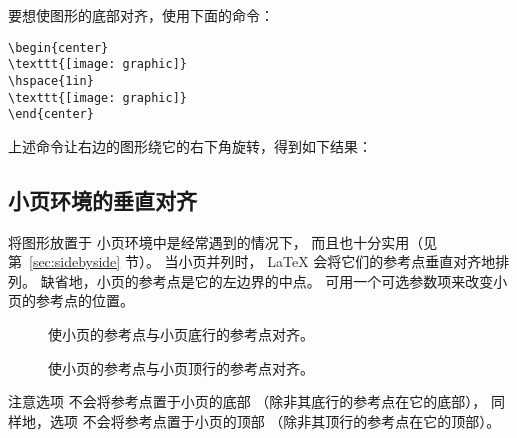 要想使图形的底部对齐，使用下面的命令：
\begin{lstlisting}
\begin{center}
\texttt{[image: graphic]}
\hspace{1in}
\texttt{[image: graphic]}
\end{center}
\end{lstlisting}
上述命令让右边的图形绕它的右下角旋转，得到如下结果：
\begin{center}
	\resizebox{1in}{!}{\usebox{\boxgraphic}}
	\hspace{1in}
\end{center}

\subsection{小页环境的垂直对齐}\label{ssec:minivalign}

将图形放置于  小页环境中是经常遇到的情况下，
而且也十分实用（见第~\ref{sec:sidebyside} 节）。
当小页并列时， \LaTeX{} 会将它们的参考点垂直对齐地排列。
缺省地，小页的参考点是它的左边界的中点。
可用一个可选参数项来改变小页的参考点的位置。
\begin{description}
	\item[\opt{[b]}] 使小页的参考点与小页底行的参考点对齐。
	\item[\opt{[t]}] 使小页的参考点与小页顶行的参考点对齐。
\end{description}

注意选项 \opt{[b]} 不会将参考点置于小页的底部
（除非其底行的参考点在它的底部），
同样地，选项 \opt{[t]} 不会将参考点置于小页的顶部
（除非其顶行的参考点在它的顶部）。

